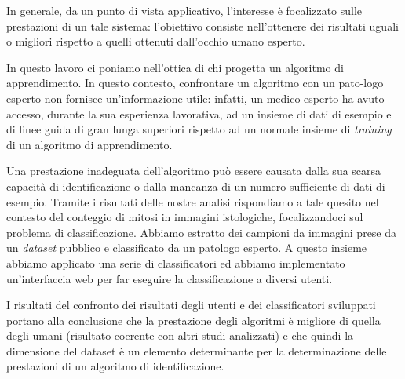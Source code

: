 \vspace{0.3cm}

In generale, da un punto di vista applicativo, l'interesse \`{e} focalizzato sulle prestazioni di un tale sistema: l'obiettivo
consiste nell'ottenere dei risultati uguali o migliori rispetto a quelli ottenuti dall'occhio umano esperto.

\vspace{0.3cm}

In questo lavoro ci poniamo nell'ottica di chi progetta un algoritmo di apprendimento. In questo contesto,
confrontare un algoritmo con un pato-logo esperto non fornisce un'informazione utile: infatti, un medico esperto ha avuto accesso,
durante la sua esperienza lavorativa, ad un insieme di dati di esempio e di linee guida di gran lunga superiori rispetto ad un normale
insieme di \textit{training} di un algoritmo di apprendimento.


\vspace{0.3cm}

Una prestazione inadeguata dell'algoritmo pu\`{o} essere causata dalla sua scarsa capacit\`{a} di identificazione o dalla
mancanza di un numero sufficiente di dati di esempio.
Tramite i risultati delle nostre analisi rispondiamo a tale quesito nel contesto del conteggio di mitosi in immagini istologiche, focalizzandoci sul problema di classificazione.
Abbiamo estratto dei campioni da immagini prese da un \textit{dataset} pubblico e classificato da un patologo esperto.
A questo insieme abbiamo applicato una serie di classificatori ed abbiamo implementato un'interfaccia web per far eseguire 
la classificazione a diversi utenti.

\vspace{0.3cm}

I risultati del confronto dei risultati degli utenti e dei classificatori sviluppati portano alla conclusione che la prestazione degli
algoritmi \`{e} migliore di quella degli umani (risultato coerente con altri studi analizzati) e che quindi la dimensione del dataset
\`{e} un elemento determinante per la determinazione delle prestazioni di un algoritmo di identificazione.

